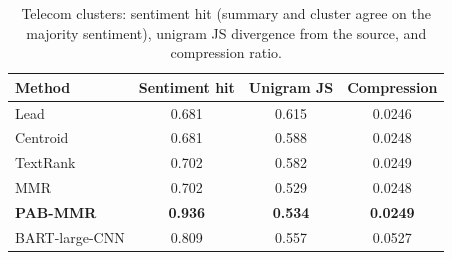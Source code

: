 \begin{table}[H]
\centering
\footnotesize
\caption{Telecom clusters: sentiment hit (summary and cluster agree on the majority sentiment), unigram JS divergence from the source, and compression ratio.}
\label{tab:telecomhits}
\begin{tabular}{lccc}
\toprule
Method & Sentiment hit & Unigram JS & Compression \\
\midrule
Lead & 0.681 & 0.615 & 0.0246 \\
Centroid & 0.681 & 0.588 & 0.0248 \\
TextRank & 0.702 & 0.582 & 0.0249 \\
MMR & 0.702 & 0.529 & 0.0248 \\
\textbf{PAB-MMR} & \textbf{0.936} & \textbf{0.534} & \textbf{0.0249} \\
BART-large-CNN & 0.809 & 0.557 & 0.0527 \\
\bottomrule
\end{tabular}
\end{table}